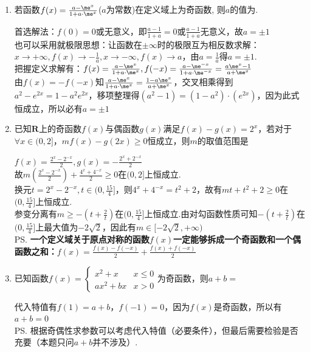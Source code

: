 \begin{enumerate}
\begin{jieda}
        故$f(x)=x\abs{x+a}$. 于是由$f(x)$为奇函数，不难得到$a=0$, 比如$f(-a)+f(a)=0$. 
        \end{jieda}
        \item 若函数$f(x)=\frac{a-\me^x}{1+a\cdot\me^x}$($a$为常数)在定义域上为奇函数, 则$a$的值为. 
        \begin{jieda}
        首选解法：$f(0)=0$或无意义，即$\frac{a-1}{1+a} = 0$或$\frac{a-1}{1+a}$无意义，故$a = \pm 1$\\
        也可以采用就极限思想：让函数在$\pm \infty$时的极限互为相反数求解：$x \rightarrow +\infty, f(x) \rightarrow -\frac{1}{a}, x \rightarrow -\infty, f(x) \rightarrow a$，由$a = \frac{1}{a}$得$a = \pm 1$. \\
        把握定义求解有：$f(x) = \frac{a-\me^x}{1+a\cdot\me^x}, f(-x) = \frac{a-\me^{-x}}{1+a\cdot\me^{-x}} = \frac{a\me^{x}-1}{a+\me^{x}}$ \\
        由$f(x) = -f(-x)$知$\frac{a-\me^x}{1+a\cdot\me^x} = \frac{1-a\me^{x}}{a+\me^{x}}$，交叉相乘得到$a^2 - e^{2x} = 1-a^2e^{2x}$，移项整理得$(a^2-1) = (1-a^2)\cdot(e^{2x})$，因为此式恒成立，所以必有$a = \pm 1$
        \end{jieda}
        \item 已知$\mathbf{R}$上的奇函数$f(x)$与偶函数$g(x)$满足$f(x) - g(x) = 2^x$，若对于$\forall x \in (0, 2]$，$mf(x) - g(2x) \geq 0$恒成立，则$m$的取值范围是\blkda[2]{$[-2\sqrt{2}, +\infty)$}
        \begin{jieda}
            $f(x) = \frac{2^x - 2^{-x}}{2}, g(x) = -\frac{2^x+2^{-x}}{2}$ \\
            故$m(\frac{2^x - 2^{-x}}{2}) + \frac{4^x+4^{-x}}{2} \geq 0$在$(0, 2]$上恒成立. \\
            换元$t = 2^x - 2^{-x}, t \in (0, \frac{15}{4}]$，则$4^x+4^{-x} = t^2+2$，故有$mt + t^2 + 2 \geq 0$在$(0, \frac{15}{4}]$上恒成立. \\
            参变分离有$m \geq -(t + \frac{2}{t})$在$(0, \frac{15}{4}]$上恒成立.由对勾函数性质可知$-(t + \frac{2}{t})$在$(0, \frac{15}{4}]$上最大值为$-2\sqrt{2}$，因此有$m \in [-2\sqrt{2}, +\infty)$ \\
            \ps \textbf{一个定义域关于原点对称的函数$f(x)$一定能够拆成一个奇函数和一个偶函数之和：$f(x) = \frac{f(x) - f(-x)}{2} + \frac{f(x)+f(-x)}{2}$}
        \end{jieda}
        \item 已知函数$f(x) = \left \{ \begin{array}{ll}
            x^2 + x & x \leq 0 \\
            ax^2 + bx & x > 0
        \end{array}\right.$为奇函数，则$a+b = $
        \begin{jieda}
            代入特值有$f(1) = a+b$，$f(-1) = 0$，因为$f(x)$是奇函数，所以有$a+b = 0$ \\
            \ps 根据奇偶性求参数可以考虑代入特值（必要条件），但最后需要检验是否充要（本题只问$a+b$并不涉及）.
        \end{jieda}
\end{enumerate}

